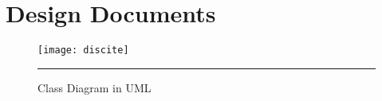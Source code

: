 
\chapter{Design Documents}
\label{AppendixC}


\begin{figure}[htbp]
\centering
\texttt{[image: discite]}
\rule{35em}{0.5pt}
\caption[Class Diagram]{Class Diagram in UML}
\label{fig:Class Diagram}
\end{figure}

